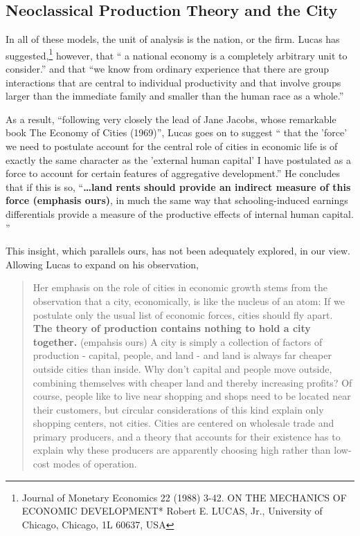 \subsection{Neoclassical Production Theory and the City}

In all of these models, the unit of analysis is the nation,  or the firm. Lucas has suggested,\footnote{Journal of Monetary Economics 22 (1988) 3-42.  ON THE MECHANICS OF ECONOMIC DEVELOPMENT*
Robert E. LUCAS, Jr., University of Chicago, Chicago, 1L 60637, USA}
however, that `` a national economy is a completely arbitrary unit to consider.'' and that ``we know from ordinary experience that there are group interactions that are central to individual productivity and that involve groups larger than the immediate family and smaller than the human race as a whole.''  


As a result, ``following very closely the lead of Jane Jacobs, whose remarkable book The Economy of Cities (1969)'', Lucas goes on to suggest `` that the 'force' we need to postulate account for the central role of cities in economic life is of exactly the same character as the 'external human capital' I have postulated as a force to account for certain features of aggregative development.''  He concludes that if this is so, ``\textbf{\dots land rents should provide an indirect measure of this force (emphasis  ours)}, in much the same way that schooling-induced earnings differentials provide a measure of the productive effects of internal human capital. ''

This insight, which parallels ours, has not been adequately explored, in our view.  Allowing Lucas to expand on his observation, 


\begin{quotation}
    Her emphasis on the role of cities in economic growth stems from the observation that a city, economically, is like the nucleus of an atom: If we postulate only the usual list of economic forces, cities should fly apart. \textbf{The theory of production contains nothing to hold a city together.} (empahsis ours) A city is simply a collection of factors of production - capital, people, and land - and land is always far cheaper outside cities than inside. Why don't capital and people move outside, combining themselves with cheaper land and thereby increasing profits? Of course, people like to live near shopping and shops need to be located near their customers, but circular considerations of this kind explain only shopping centers, not cities. Cities are centered on wholesale trade and primary producers, and a theory that accounts for their existence has to explain why these producers are apparently choosing high rather than low-cost modes of operation.
\end{quotation}

